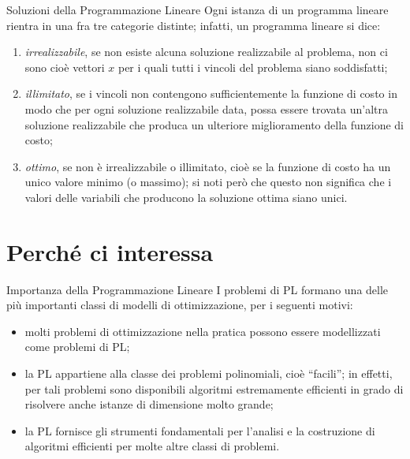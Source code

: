 \documentclass{beamer}
\begin{document}
\begin{frame}[allowframebreaks]{Soluzioni della Programmazione Lineare}
Ogni istanza di un programma lineare rientra in una fra tre categorie
distinte; infatti, un programma lineare si dice:
\begin{enumerate}
\item \emph{irrealizzabile}, se non esiste alcuna soluzione realizzabile
al problema, non ci sono cioè vettori $x$ per i quali tutti i vincoli
del problema siano soddisfatti;
\item \emph{illimitato}, se i vincoli non contengono sufficientemente la
funzione di costo in modo che per ogni soluzione realizzabile data,
possa essere trovata un'altra soluzione realizzabile che produca un
ulteriore miglioramento della funzione di costo;
\item \emph{ottimo}, se non è irrealizzabile o illimitato, cioè se la funzione
di costo ha un unico valore minimo (o massimo); si noti però che questo
non significa che i valori delle variabili che producono la soluzione
ottima siano unici.
\end{enumerate}
\end{frame}

\section{Perché ci interessa}

\begin{frame}[allowframebreaks]{Importanza della Programmazione Lineare}
I problemi di PL formano una delle più importanti classi di modelli
di ottimizzazione, per i seguenti motivi:
\begin{itemize}
\item molti problemi di ottimizzazione nella pratica possono essere modellizzati
come problemi di PL;
\item la PL appartiene alla classe dei problemi polinomiali, cioè ``facili'';
in effetti, per tali problemi sono disponibili algoritmi estremamente
efficienti in grado di risolvere anche istanze di dimensione molto
grande;
\item la PL fornisce gli strumenti fondamentali per l'analisi e la costruzione
di algoritmi efficienti per molte altre classi di problemi.
\end{itemize}
\end{frame}
\end{document}
